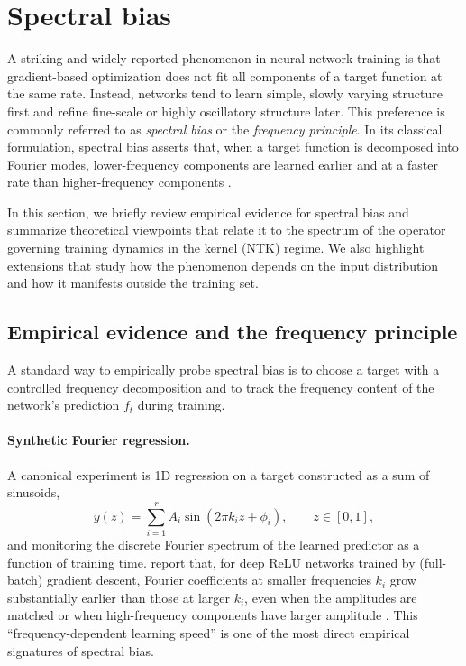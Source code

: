\section{Spectral bias}\label{sec:spectral-bias}

A striking and widely reported phenomenon in neural network training is that
gradient-based optimization does not fit all components of a target function at
the same rate. Instead, networks tend to learn simple, slowly varying structure
first and refine fine-scale or highly oscillatory structure later. This
preference is commonly referred to as \emph{spectral bias} or the
\emph{frequency principle}. In its classical formulation, spectral bias asserts
that, when a target function is decomposed into Fourier modes, lower-frequency
components are learned earlier and at a faster rate than higher-frequency
components
\citep{rahaman2019spectralbiasneuralnetworks,xu2019training,zhi2020frequency}.

In this section, we briefly review empirical evidence for spectral bias and
summarize theoretical viewpoints that relate it to the spectrum of the operator
governing training dynamics in the kernel (NTK) regime. We also highlight
extensions that study how the phenomenon depends on the input distribution and
how it manifests outside the training set.

\subsection{Empirical evidence and the frequency principle}

A standard way to empirically probe spectral bias is to choose a target with a
controlled frequency decomposition and to track the frequency content of the
network's prediction $f_t$ during training.

\paragraph{Synthetic Fourier regression.}
A canonical experiment is 1D regression on a target constructed as a sum of
sinusoids,
\[
	y(z)=\sum_{i=1}^r A_i \sin(2\pi k_i z + \phi_i),
	\qquad z\in[0,1],
\]
and monitoring the discrete Fourier spectrum of the learned predictor as a
function of training time. \citet{rahaman2019spectralbiasneuralnetworks} report
that, for deep ReLU networks trained by (full-batch) gradient descent, Fourier
coefficients at smaller frequencies $k_i$ grow substantially earlier than those
at larger $k_i$, even when the amplitudes are matched or when high-frequency
components have larger amplitude \citep{rahaman2019spectralbiasneuralnetworks}.
This ``frequency-dependent learning speed'' is one of the most direct empirical
signatures of spectral bias.

